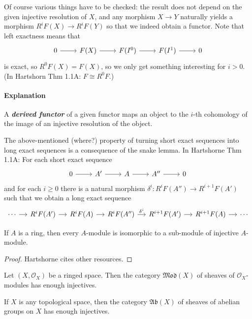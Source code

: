 Of course various things have to be checked: the result does not depend on the given injective resolution of $X$, and any morphism $X\to Y$ naturally yields a morphism $R^iF(X)\to R^iF(Y)$ so that we indeed obtain a functor. Note that left exactness means that
\[\begin{tikzcd}
	0\arrow[r]&F(X)\arrow[r]&F(I^0)\arrow[r]&F(I^1)\arrow[r]&0
\end{tikzcd}\]
is exact, so $R^0F(X)=F(X)$, so we only get something interesting for $i>0$. (In Hartshorn Thm 1.1A: $F\cong R^0F$.)

\paragraph{Explanation} A \textit{\textbf{derived functor}} of a given functor maps an object to the $i$-th cohomology of the image of an injective resolution of the object.

The above-mentioned (where?) property of turning short exact sequences into long exact sequences is a consequence of the snake lemma. In Hartshorne Thm 1.1A: For each short exact sequence
\[\begin{tikzcd}
	0\arrow[r]&A'\arrow[r]&A\arrow[r]&A''\arrow[r]&0
\end{tikzcd}\]
and for each $i\geq 0$ there is a natural morphism $\delta^i:R^iF(A'')\to R^{i+1}F(A')$ such that we obtain a long exact sequence
\[\begin{tikzcd}[column sep=small]
	\cdots\arrow[r]&R^iF(A')\arrow[r]&R^iF(A)\arrow[r]&R^iF(A'')\arrow[r,"\delta^i"]&R^{i+1}F(A')\arrow[r]&R^{i+1}F(A)\arrow[r]&\cdots
\end{tikzcd}\]


\begin{prop}
	If $A$ is a ring, then every $A$-module is isomorphic to a sub-module of injective $A$-module.
\end{prop}

\begin{proof}
	Hartshorne cites other resources.
\end{proof}

\begin{prop}
	Let  $(X,\mathcal{O}_X)$ be a ringed space. Then the category $\mathfrak{Mod}(X)$ of sheaves of $\mathcal{O}_X$-modules has enough injectives.
\end{prop}

\begin{coro}
	If $X$ is any topological space, then the category $\mathfrak{Ab}(X)$ of sheaves of abelian groups on $X$ has enough injectives.
\end{coro}

